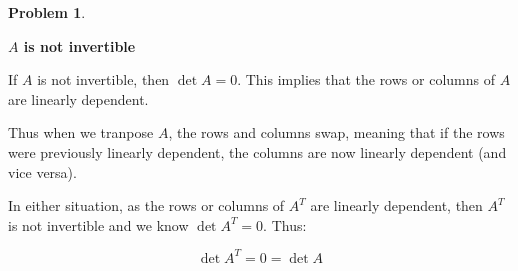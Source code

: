 \documentclass[12pt, oneside]{amsart}
\theoremstyle{definition}
\newtheorem{prob}{Problem}
\begin{document}
\begin{prob}
\begin{enumerate}
\begin{solution}
    \textbf{$A$ is not invertible}
    
    If $A$ is not invertible, then $\det A = 0$.
    This implies that the rows or columns of $A$ are linearly dependent. 
    
    Thus when we tranpose $A$, the rows and columns swap, meaning that if the rows were previously linearly dependent, the columns are now linearly dependent (and vice versa).

    In either situation, as the rows or columns of $A^T$ are linearly dependent, then $A^T$ is not invertible and we know $\det A^T = 0$.
    Thus: 

    \[
    \det A^T = 0 = \det A
    \]
    
    \vspace{0.3cm}
    
    \end{solution}
    \end{enumerate}
\end{prob}
\end{document}
